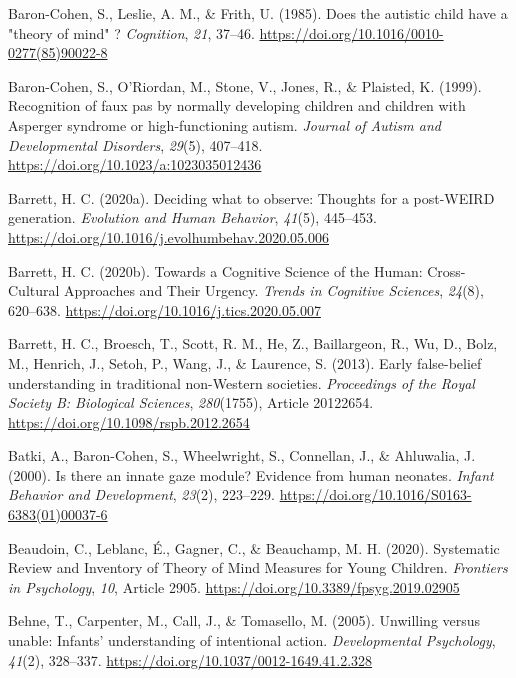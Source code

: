 \documentclass[
]{scrbook}
\newlength{\cslhangindent}
\newenvironment{CSLReferences}[2] %
 {\begin{list}{}{%
  \setlength{\itemindent}{0pt}
  \setlength{\leftmargin}{0pt}
  \setlength{\parsep}{0pt}
  \ifodd #1
   \setlength{\leftmargin}{\cslhangindent}
   \setlength{\itemindent}{-1\cslhangindent}
  \fi
  \setlength{\itemsep}{#2\baselineskip}}}
 {\end{list}}
\begin{document}
\begin{CSLReferences}{1}{0}
Baron-Cohen, S., Leslie, A. M., \& Frith, U. (1985). Does the autistic child have a "theory of mind" ? \emph{Cognition}, \emph{21}, 37--46. \url{https://doi.org/10.1016/0010-0277(85)90022-8}

Baron-Cohen, S., O'Riordan, M., Stone, V., Jones, R., \& Plaisted, K. (1999). Recognition of faux pas by normally developing children and children with {Asperger} syndrome or high-functioning autism. \emph{Journal of Autism and Developmental Disorders}, \emph{29}(5), 407--418. \url{https://doi.org/10.1023/a:1023035012436}

Barrett, H. C. (2020a). Deciding what to observe: {Thoughts} for a post-{WEIRD} generation. \emph{Evolution and Human Behavior}, \emph{41}(5), 445--453. \url{https://doi.org/10.1016/j.evolhumbehav.2020.05.006}

Barrett, H. C. (2020b). Towards a {Cognitive Science} of the {Human}: {Cross-Cultural Approaches} and {Their Urgency}. \emph{Trends in Cognitive Sciences}, \emph{24}(8), 620--638. \url{https://doi.org/10.1016/j.tics.2020.05.007}

Barrett, H. C., Broesch, T., Scott, R. M., He, Z., Baillargeon, R., Wu, D., Bolz, M., Henrich, J., Setoh, P., Wang, J., \& Laurence, S. (2013). Early false-belief understanding in traditional non-{Western} societies. \emph{Proceedings of the Royal Society B: Biological Sciences}, \emph{280}(1755), Article 20122654. \url{https://doi.org/10.1098/rspb.2012.2654}

Batki, A., Baron-Cohen, S., Wheelwright, S., Connellan, J., \& Ahluwalia, J. (2000). Is there an innate gaze module? {Evidence} from human neonates. \emph{Infant Behavior and Development}, \emph{23}(2), 223--229. \url{https://doi.org/10.1016/S0163-6383(01)00037-6}

Beaudoin, C., Leblanc, É., Gagner, C., \& Beauchamp, M. H. (2020). Systematic {Review} and {Inventory} of {Theory} of {Mind Measures} for {Young Children}. \emph{Frontiers in Psychology}, \emph{10}, Article 2905. \url{https://doi.org/10.3389/fpsyg.2019.02905}

Behne, T., Carpenter, M., Call, J., \& Tomasello, M. (2005). Unwilling versus unable: Infants' understanding of intentional action. \emph{Developmental Psychology}, \emph{41}(2), 328--337. \url{https://doi.org/10.1037/0012-1649.41.2.328}


\end{CSLReferences}
\end{document}
